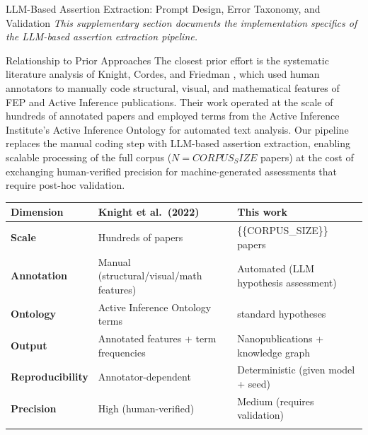 \documentclass[
  ignorenonframetext,
]{beamer}
\author{\texorpdfstring{}{}}
\date{}
\newcounter{none} %
\begin{document}
\begin{frame}[fragile]{LLM-Based Assertion Extraction: Prompt Design,
Error Taxonomy, and Validation \label{sec:extraction_pipeline}}
\protect{}\label{llm-based-assertion-extraction-prompt-design-error-taxonomy-and-validation}
\emph{This supplementary section documents the implementation specifics
of the LLM-based assertion extraction pipeline.}

\begin{block}{Relationship to Prior Approaches}
\protect{}\label{relationship-to-prior-approaches}
The closest prior effort is the systematic literature analysis of
Knight, Cordes, and Friedman \citep{knight2022fep}, which used human
annotators to manually code structural, visual, and mathematical
features of FEP and Active Inference publications. Their work operated
at the scale of hundreds of annotated papers and employed terms from the
Active Inference Institute's Active Inference Ontology for automated
text analysis. Our pipeline replaces the manual coding step with
LLM-based assertion extraction, enabling scalable processing of the full
corpus (\(N = {{CORPUS_SIZE}}\) papers) at the cost of exchanging
human-verified precision for machine-generated assessments that require
post-hoc validation.

{\def\LTcaptype{none} %
\begin{longtable}[]{@{}
  >{\raggedright\arraybackslash}p{}
  >{\raggedright\arraybackslash}p{}
  >{\raggedright\arraybackslash}p{}@{}}
\toprule\noalign{}
\begin{minipage}[b]{\linewidth}\raggedright
Dimension
\end{minipage} & \begin{minipage}[b]{\linewidth}\raggedright
Knight et al.~(2022)
\end{minipage} & \begin{minipage}[b]{\linewidth}\raggedright
This work
\end{minipage} \\
\midrule\noalign{}
\endhead
\textbf{Scale} & Hundreds of papers & \{\{CORPUS\_SIZE\}\} papers \\
\textbf{Annotation} & Manual (structural/visual/math features) &
Automated (LLM hypothesis assessment) \\
\textbf{Ontology} & Active Inference Ontology terms & 8 standard
hypotheses \\
\textbf{Output} & Annotated features + term frequencies &
Nanopublications + knowledge graph \\
\textbf{Reproducibility} & Annotator-dependent & Deterministic (given
model + seed) \\
\textbf{Precision} & High (human-verified) & Medium (requires
validation) \\
\bottomrule\noalign{}
\end{longtable}
}
\end{block}


\end{frame}
\end{document}
